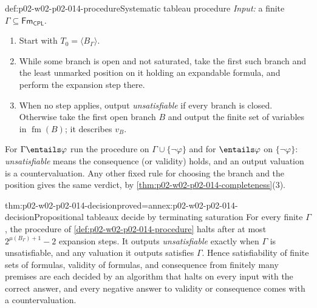 \begin{hbmethod}{def:p02-w02-p02-014-procedure}{Systematic tableau procedure}
\emph{Input:} a finite \(\Gamma\subseteq\mathsf{Fm}_{\mathsf{CPL}}\).
\begin{enumerate}
  \item Start with \(T_0=\langle B_\Gamma\rangle\).
  \item While some branch is open and not saturated, take the first such
        branch and the least unmarked position on it holding an expandable
        formula, and perform the expansion step there.
  \item When no step applies, output \emph{unsatisfiable} if every branch is
        closed.  Otherwise take the first open branch \(B\) and output the
        finite set of variables in \(\operatorname{fm}(B)\); it describes \(v_B\).
\end{enumerate}
For \(\Gamma\entails\varphi\) run the procedure on
\(\Gamma\cup\{\neg\varphi\}\) and for \(\entails\varphi\) on
\(\{\neg\varphi\}\): \emph{unsatisfiable} means the consequence (or validity)
holds, and an output valuation is a countervaluation.  Any other fixed rule
for choosing the branch and the position gives the same verdict, by
\cref{thm:p02-w02-p02-014-completeness}(3).
\end{hbmethod}

\begin{hbtheorem}{thm:p02-w02-p02-014-decision}{proved=annex:p02-w02-p02-014-decision}{Propositional tableaux decide by terminating saturation}
For every finite \(\Gamma\), the procedure of
\cref{def:p02-w02-p02-014-procedure} halts after at most
\(2^{\mu(B_\Gamma)+1}-2\) expansion steps.  It outputs \emph{unsatisfiable}
exactly when \(\Gamma\) is unsatisfiable, and any valuation it outputs
satisfies \(\Gamma\).  Hence satisfiability of finite sets of formulas,
validity of formulas, and consequence from finitely many premises are each
decided by an algorithm that halts on every input with the correct answer,
and every negative answer to validity or consequence comes with a
countervaluation.
\end{hbtheorem}

